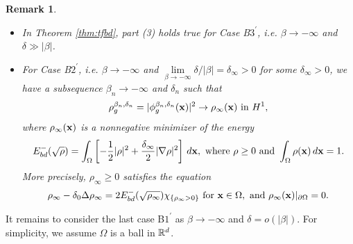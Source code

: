 \documentclass{elsarticle}
\newcommand{\be}{\begin{equation}}
\newcommand{\ee}{\end{equation}}
\newtheorem{remark}{Remark}[section]
\newcommand{\bx}{{\bf x} }
\begin{document}
\begin{remark}
\begin{itemize}
 \item In Theorem \ref{thm:tfbd}, part (3)  holds true for Case B$3^\prime$, i.e. $\beta\to-\infty$ and $\delta\gg|\beta|$.
 \item For Case B$2^\prime$,
i.e. $\beta\to-\infty$ and  $\lim\limits_{\beta\to-\infty}\delta/|\beta|=\delta_\infty>0$ for some $\delta_\infty>0$,
we have a subsequence $\beta_n\to-\infty$ and $\delta_n$ such that
\be
\rho_g^{\beta_n,\delta_n}=|\phi_g^{\beta_n,\delta_n}(\bx)|^2\to\rho_\infty(\bx) \text{ in } H^1,
\ee
where $\rho_\infty(\bx)$ is a  nonnegative minimizer of the energy
\be
E_{bd}^-(\sqrt{\rho})=\int_{\Omega}\left[-\frac{1}{2}|\rho|^2+\frac{\delta_\infty}{2}|\nabla\rho|^2\right]\,d\bx,\text{ where } \rho\ge0\text{ and }\int_{\Omega}\rho(\bx)\,d\bx=1.
\ee
More precisely, $\rho_{\infty}\ge0$ satisfies the equation
\be
\rho_\infty-\delta_0\Delta\rho_\infty=2E_{bd}^-(\sqrt{\rho_\infty})\chi_{\{\rho_\infty>0\}} \text{ for } \bx\in\Omega, \text{ and }\rho_\infty(\mathbf{x})|_{\partial\Omega}=0.
\ee
\end{itemize}
\end{remark}
It remains to consider the last case B$1^\prime$   as $\beta\to-\infty$ and $\delta=o(|\beta|)$. For simplicity, we
assume $\Omega$ is a ball in $\Bbb R^d$.
\end{document}

